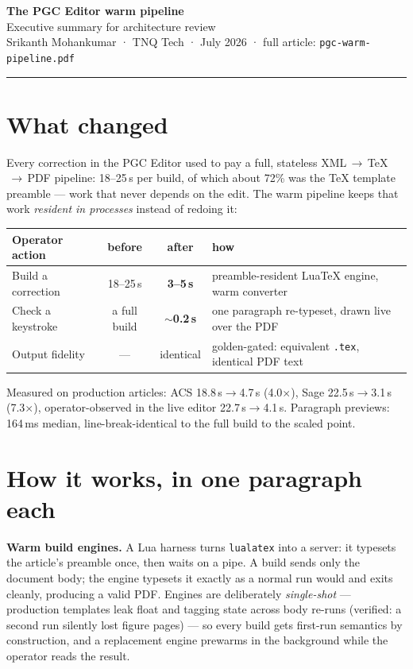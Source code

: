\documentclass[10pt]{article}
\def\LuaTeX{Lua\TeX}
\begin{document}
{\LARGE\bfseries The PGC Editor warm pipeline}\\[2pt]
{\large Executive summary for architecture review}\\[4pt]
{\small Srikanth Mohankumar · TNQ Tech · July 2026 ·
full article: \texttt{pgc-warm-pipeline.pdf}}

\vspace{2pt}\hrule\vspace{6pt}

\section*{What changed}

Every correction in the PGC Editor used to pay a full, stateless
XML$\,\to\,$\TeX$\,\to\,$PDF pipeline: 18--25\,s per build, of which
about 72\% was the \TeX{} template preamble --- work that never depends
on the edit. The warm pipeline keeps that work \emph{resident in
processes} instead of redoing it:

\begin{center}
\small
\begin{tabular}{@{}lccl@{}}
\toprule
Operator action & before & after & how\\
\midrule
Build a correction & 18--25\,s & \textbf{3--5\,s} &
  preamble-resident \LuaTeX{} engine, warm converter\\
Check a keystroke & a full build & \textbf{$\sim$0.2\,s} &
  one paragraph re-typeset, drawn live over the PDF\\
Output fidelity & --- & identical &
  golden-gated: equivalent \texttt{.tex}, identical PDF text\\
\bottomrule
\end{tabular}
\end{center}

Measured on production articles: ACS 18.8\,s$\to$4.7\,s (4.0$\times$),
Sage 22.5\,s$\to$3.1\,s (7.3$\times$), operator-observed in the live
editor 22.7\,s$\to$4.1\,s. Paragraph previews: 164\,ms median,
line-break-identical to the full build to the scaled point.

\section*{How it works, in one paragraph each}

\textbf{Warm build engines.} A Lua harness turns \texttt{lualatex} into
a server: it typesets the article's preamble once, then waits on a pipe.
A build sends only the document body; the engine typesets it exactly as
a normal run would and exits cleanly, producing a valid PDF. Engines are
deliberately \emph{single-shot} --- production templates leak float and
tagging state across body re-runs (verified: a second run silently lost
figure pages) --- so every build gets first-run semantics by
construction, and a replacement engine prewarms in the background while
the operator reads the result.
\end{document}
